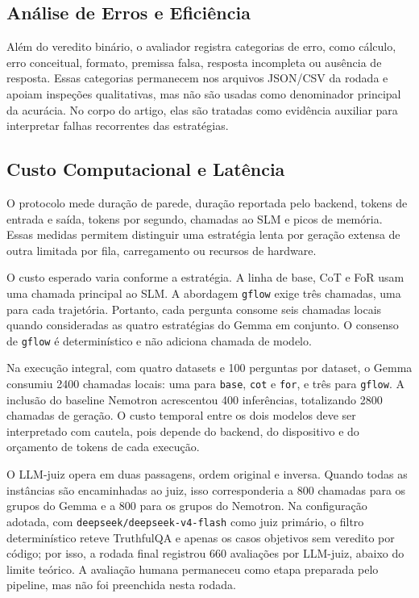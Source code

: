 \documentclass[12pt]{article}
\begin{document}
\subsection{An\'alise de Erros e Efici\^encia}

Al\'em do veredito bin\'ario, o avaliador registra categorias de erro, como c\'alculo, erro conceitual, formato, premissa falsa, resposta incompleta ou aus\^encia de resposta. Essas categorias permanecem nos arquivos JSON/CSV da rodada e apoiam inspe\c{c}\~oes qualitativas, mas n\~ao s\~ao usadas como denominador principal da acur\'acia. No corpo do artigo, elas s\~ao tratadas como evid\^encia auxiliar para interpretar falhas recorrentes das estrat\'egias.

\subsection{Custo Computacional e Lat\^encia}

O protocolo mede duração de parede, duração reportada pelo backend, tokens de entrada e saída, tokens por segundo, chamadas ao SLM e picos de memória. Essas medidas permitem distinguir uma estratégia lenta por geração extensa de outra limitada por fila, carregamento ou recursos de hardware.

O custo esperado varia conforme a estratégia. A linha de base, CoT e FoR usam uma chamada principal ao SLM. A abordagem \texttt{gflow} exige três chamadas, uma para cada trajetória. Portanto, cada pergunta consome seis chamadas locais quando consideradas as quatro estratégias do Gemma em conjunto. O consenso de \texttt{gflow} é determinístico e não adiciona chamada de modelo.

Na execução integral, com quatro datasets e 100 perguntas por dataset, o Gemma consumiu 2400 chamadas locais: uma para \texttt{base}, \texttt{cot} e \texttt{for}, e três para \texttt{gflow}. A inclusão do baseline Nemotron acrescentou 400 inferências, totalizando 2800 chamadas de geração. O custo temporal entre os dois modelos deve ser interpretado com cautela, pois depende do backend, do dispositivo e do orçamento de tokens de cada execução.

O LLM-juiz opera em duas passagens, ordem original e inversa. Quando todas as instâncias são encaminhadas ao juiz, isso corresponderia a 800 chamadas para os grupos do Gemma e a 800 para os grupos do Nemotron. Na configuração adotada, com \texttt{deepseek/deepseek-v4-flash} como juiz primário, o filtro determinístico reteve TruthfulQA e apenas os casos objetivos sem veredito por código; por isso, a rodada final registrou 660 avaliações por LLM-juiz, abaixo do limite teórico. A avaliação humana permaneceu como etapa preparada pelo pipeline, mas não foi preenchida nesta rodada.
\end{document}
